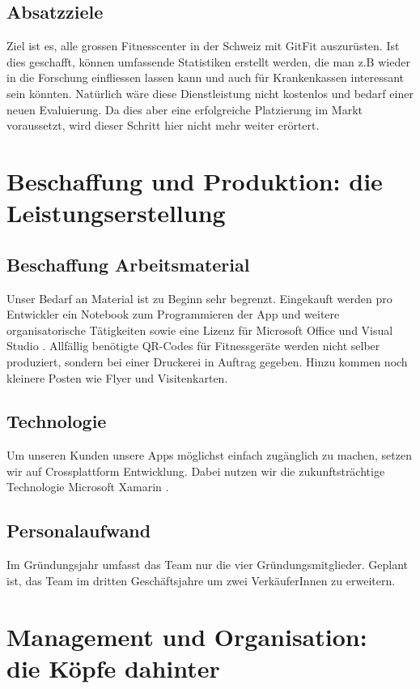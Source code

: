 \subsection{Absatzziele}
Ziel ist es, alle grossen Fitnesscenter in der Schweiz mit GitFit auszurüsten. Ist dies geschafft, können umfassende Statistiken erstellt werden, die man z.B wieder in die Forschung einfliessen lassen kann und auch für Krankenkassen interessant sein könnten. Natürlich wäre diese Dienstleistung nicht kostenlos und bedarf einer neuen Evaluierung. Da dies aber eine erfolgreiche Platzierung im Markt voraussetzt, wird dieser Schritt hier nicht mehr weiter erörtert.

\clearpage
\section{Beschaffung und Produktion: die Leistungserstellung}
\subsection{Beschaffung Arbeitsmaterial}
Unser Bedarf an Material ist zu Beginn sehr begrenzt. Eingekauft werden pro Entwickler ein Notebook zum Programmieren der App und weitere organisatorische Tätigkeiten sowie eine Lizenz für Microsoft Office und Visual Studio \cite{visual-studio}. Allfällig benötigte QR-Codes für Fitnessgeräte werden nicht selber produziert, sondern bei einer Druckerei in Auftrag gegeben. Hinzu kommen noch kleinere Posten wie Flyer und Visitenkarten.
\subsection{Technologie}
Um unseren Kunden unsere Apps möglichst einfach zugänglich zu machen, setzen wir auf Crossplattform Entwicklung. Dabei nutzen wir die zukunftsträchtige Technologie Microsoft Xamarin \cite{xamarin} .
\subsection{Personalaufwand}
Im Gründungsjahr umfasst das Team nur die vier Gründungsmitglieder. Geplant ist, das Team im dritten Geschäftsjahre um zwei VerkäuferInnen zu erweitern.

\clearpage
\section{Management und Organisation:  \\ \hspace{25pt}die Köpfe dahinter}

